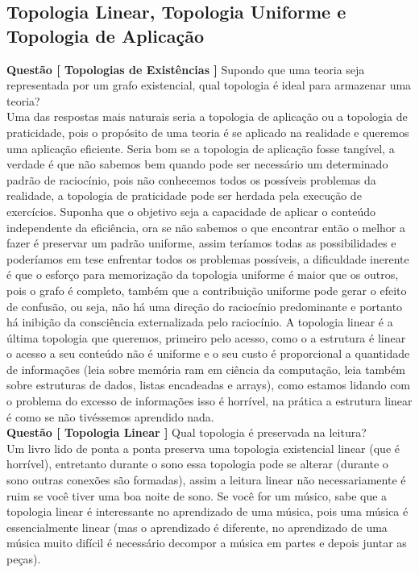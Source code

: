 \subsection{Topologia Linear, Topologia Uniforme e Topologia de Aplicação}

\hspace{\baselineskip}

\textbf{Questão [ Topologias de Existências ]} Supondo que uma teoria seja representada por um grafo existencial, qual topologia é ideal para armazenar uma teoria?\\

Uma das respostas mais naturais seria a topologia de aplicação ou a topologia de praticidade, pois o propósito de uma teoria é se aplicado na realidade e queremos uma aplicação eficiente. Seria bom se a topologia de aplicação fosse tangível, a verdade é que não sabemos bem quando pode ser necessário um determinado padrão de raciocínio, pois não conhecemos todos os possíveis problemas da realidade, a topologia de praticidade pode ser herdada pela execução de exercícios. Suponha que o objetivo seja a capacidade de aplicar o conteúdo independente da eficiência, ora se não sabemos o que encontrar então o melhor a fazer é preservar um padrão uniforme, assim teríamos todas as possibilidades e poderíamos em tese enfrentar todos os problemas possíveis, a dificuldade inerente é que o esforço para memorização da topologia uniforme é maior que os outros, pois o grafo é completo, também que a contribuição uniforme pode gerar o efeito de confusão, ou seja, não há uma direção do raciocínio predominante e portanto há inibição da consciência externalizada pelo raciocínio. A topologia linear é a última topologia que queremos, primeiro pelo acesso, como o a estrutura é linear o acesso a seu conteúdo não é uniforme e o seu custo é proporcional a quantidade de informações (leia sobre memória ram em ciência da computação, leia também sobre estruturas de dados, listas encadeadas e arrays), como estamos lidando com o problema do excesso de informações isso é horrível, na prática a estrutura linear é como se não tivéssemos aprendido nada.\\

\textbf{Questão [ Topologia Linear ]} Qual topologia é preservada na leitura?\\

Um livro lido de ponta a ponta preserva uma topologia existencial linear (que é horrível), entretanto durante o sono essa topologia pode se alterar (durante o sono outras conexões são formadas), assim a leitura linear não necessariamente é ruim se você tiver uma boa noite de sono. Se você for um músico, sabe que a topologia linear é interessante no aprendizado de uma música, pois uma música é essencialmente linear (mas o aprendizado é diferente, no aprendizado de uma música muito difícil é necessário decompor a música em partes e depois juntar as peças).\\

